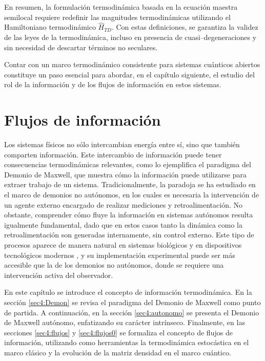 En resumen, la formulación termodinámica basada en la ecuación maestra semilocal requiere redefinir las magnitudes termodinámicas utilizando el Hamiltoniano termodinámico $\hat{H}_{TD}$. Con estas definiciones, se garantiza la validez de las leyes de la termodinámica, incluso en presencia de cuasi–degeneraciones y sin necesidad de descartar términos no seculares.

Contar con un marco termodinámico consistente para sistemas cuánticos abiertos constituye un paso esencial para abordar, en el capítulo siguiente, el estudio del rol de la información y de los flujos de información en estos sistemas.

\chapter{Flujos de información} 

Los sistemas físicos no sólo intercambian energía entre sí, sino que también comparten información. Este intercambio de información puede tener consecuencias termodinámicas relevantes, como lo ejemplifica el paradigma del Demonio de Maxwell, que muestra cómo la información puede utilizarse para extraer trabajo de un sistema. Tradicionalmente, la paradoja se ha estudiado en el marco de demonios no autónomos, en los cuales es necesaria la intervención de un agente externo encargado de realizar mediciones y retroalimentación. No obstante, comprender cómo fluye la información en sistemas autónomos resulta igualmente fundamental, dado que en estos casos tanto la dinámica como la retroalimentación son generadas internamente, sin control externo. Este tipo de procesos aparece de manera natural en sistemas biológicos y en dispositivos tecnológicos modernos \cite{parrondo2023information,koski2015chip}, y su implementación experimental puede ser más accesible que la de los demonios no autónomos, donde se requiere una intervención activa del observador.

En este capítulo se introduce el concepto de información termodinámica. En la sección \ref{sec4:Demon} se revisa el paradigma del Demonio de Maxwell como punto de partida. A continuación, en la sección \ref{sec4:autonomo} se presenta el Demonio de Maxwell autónomo, enfatizando su carácter intrínseco. Finalmente, en las secciones \ref{sec4:flujos} y \ref{sec4:flujos0} se formaliza el concepto de flujos de información, utilizando como herramientas la termodinámica estocástica en el marco clásico y la evolución de la matriz densidad en el marco cuántico\cite{horowitz2014thermodynamics,ptaszynski2019thermodynamics}.

